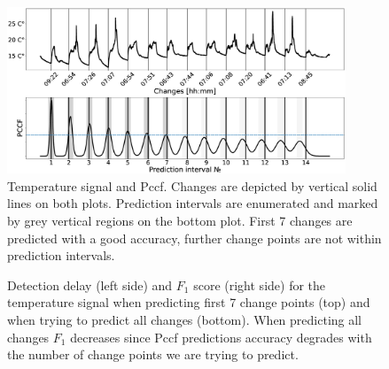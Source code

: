 \begin{figure}[!htb]
	\centering
	\includegraphics[width=0.9\textwidth]{articles/pics/journal_paper/temperature_signal}
	\caption{
    Temperature signal and Pccf.
    Changes are depicted by vertical solid lines on both plots.
    Prediction intervals are enumerated and marked by grey vertical regions on the bottom plot. First 7 changes are predicted with a good accuracy, further change points are not within prediction intervals.
  }
	\label{fig:temperature_signal}
\end{figure}
\begin{figure}[!htb]
		\centering
  \caption{Detection delay (left side) and $F_1$ score (right side) for the temperature signal when predicting first 7 change points (top) and when trying to predict all changes (bottom). 
  When predicting all changes $F_1$ decreases since Pccf predictions accuracy degrades with the number of change points we are trying to predict. 
  }
	\label{fig:performance_temperature_signal}
\end{figure}

